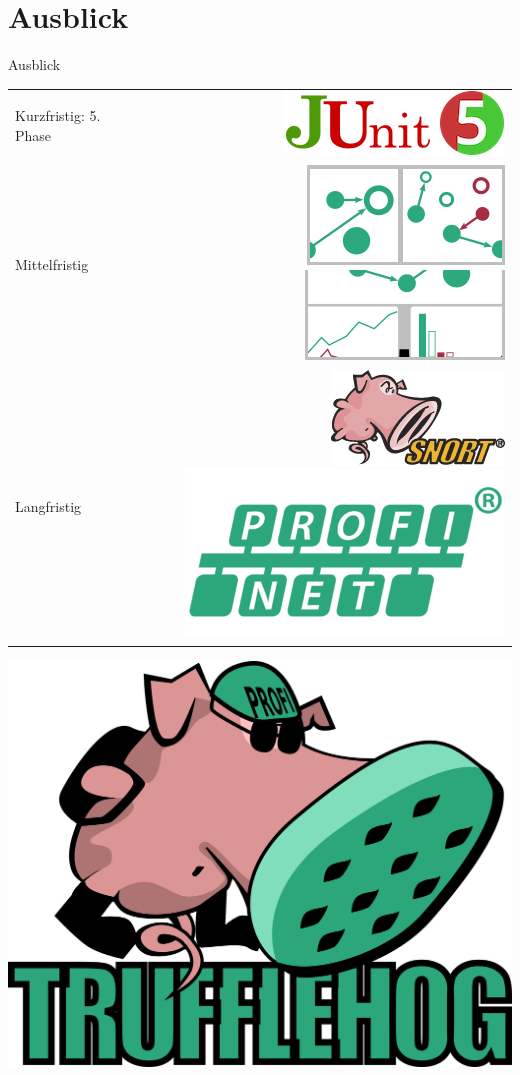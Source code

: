 \documentclass[18pt]{beamer}
\begin{document}
\section{Ausblick}
\begin{frame}{Ausblick}
	\begin{tabular}{m{5cm}r}
		Kurzfristig: 5. Phase \vspace{0.5cm} & \includegraphics[width=0.3\linewidth]{images/max-junit} \\
		\pause
		Mittelfristig \vspace{0.5cm} & \includegraphics[width=0.2\linewidth]{images/max-tiling} \hspace{0.5cm} \includegraphics[width=0.2\linewidth]{images/max-stats} \\
		\pause
		Langfristig \vspace{0.5cm} & \includegraphics[width=0.2\linewidth]{images/max-snort} \hspace{0.5cm} \includegraphics[width=0.2\linewidth]{images/max-profinet} \\
	\end{tabular}
\end{frame}

\begin{frame}
	\centering
	\includegraphics[width=0.8\linewidth]{images/title}
\end{frame}


\appendix
\beginbackup


\backupend
\end{document}
